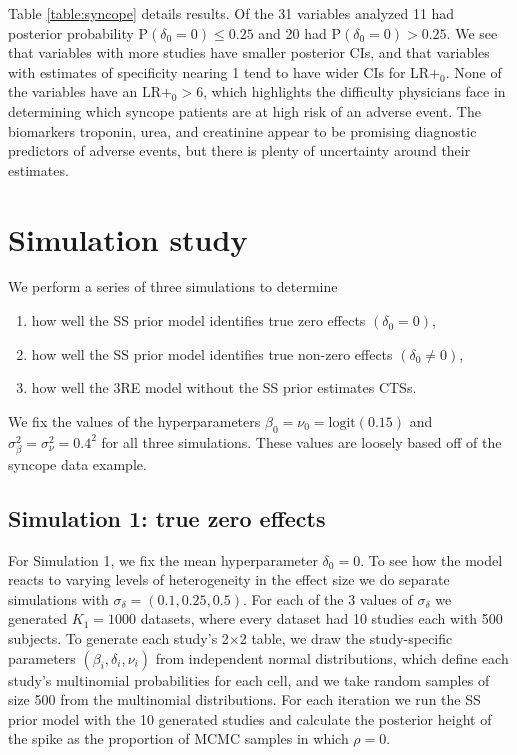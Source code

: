 \documentclass[AMA,STIX1COL]{WileyNJD-v2}
\begin{document}
Table \ref{table:syncope} details results. Of the 31 variables analyzed 11 had posterior probability $\mbox{P}(\delta_0 = 0) \le 0.25$ and 20 had $\mbox{P}(\delta_0 = 0) > 0.25$. We see that variables with more studies have smaller posterior CIs, and that variables with estimates of specificity nearing 1 tend to have wider CIs for LR$+_0$. None of the variables have an $\mbox{LR}+_0 > 6$, which highlights the difficulty physicians face in determining which syncope patients are at high risk of an adverse event. The biomarkers troponin, urea, and creatinine appear to be promising diagnostic predictors of adverse events, but there is plenty of uncertainty around their estimates. 


\section{Simulation study} \label{sec:simulation}

We perform a series of three simulations to determine 
\begin{enumerate}
\item{how well the SS prior model identifies true zero effects $(\delta_0 = 0)$,}
\item{how well the SS prior model identifies true non-zero effects $(\delta_0 \ne 0)$,}
\item{how well the 3RE model without the SS prior estimates CTSs.}
\end{enumerate}
\noindent We fix the values of the hyperparameters $\beta_0 = \nu_0 = \mbox{logit}(0.15)$ and $\sigma_\beta^2 = \sigma_\nu^2 = 0.4^2$ for all three simulations. These values are loosely based off of the syncope data example. 

\subsection{Simulation 1: true zero effects} \label{sec:sim_zero}

For Simulation 1, we fix the mean hyperparameter $\delta_0 = 0$. To see how the model reacts to varying levels of heterogeneity in the effect size we do separate simulations with $\sigma_\delta = (0.1, 0.25, 0.5)$. For each of the 3 values of $\sigma_\delta$ we generated $K_1 = 1000$ datasets, where every dataset had 10 studies each with 500 subjects. To generate each study's 2$\times$2 table, we draw the study-specific parameters $(\beta_i, \delta_i, \nu_i)$ from independent normal distributions, which define each study's multinomial probabilities for each cell, and we take random samples of size 500 from the multinomial distributions. For each iteration we run the SS prior model with the 10 generated studies and calculate the posterior height of the spike as the proportion of MCMC samples in which $\rho = 0$. 
\end{document}
